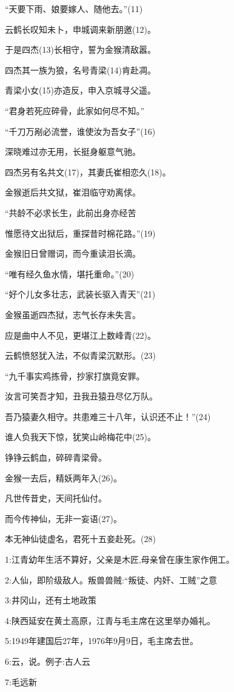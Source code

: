 \documentclass[
]{article}
\begin{document}
``天要下雨、娘要嫁人、随他去。''(11)

云鹤长叹知未卜，申城调来新朋邀(12)。

于是四杰(13)长相守，誓为金猴清敌嚣。

四杰其一族为狼，名号青梁(14)肯赴凋。

青梁小女(15)亦造反，申入京城寻父遥。

``君身若死应碎骨，此家如何尽不知。''

``千刀万剐必流誉，谁使汝为吾女子''(16)

深晓难过亦无用，长挺身躯意气驰。

四杰另有名共文(17)，其妻氏崔相恋久(18)。

金猴逝后共文狱，崔泪临守劝离俅。

``共龄不必求长生，此前出身亦经苦

惟愿待文出狱后，重探昔时棉花路。''(19)

金猴旧日曾赠词，而今重读泪长滴。

``唯有经久鱼水情，堪托重命。''(20)

``好个儿女多壮志，武装长驱入青天''(21)

金猴虽逝四杰狱，志气长存未失言。

应是曲中人不见，更堪江上数峰青(22)。

云鹤愤怒犹入法，不似青梁沉默形。(23)

``九千事实鸡拣骨，抄家打旗竟安罪。

汝言可笑吾才知，丑我丑猿丑尽亿万队。

吾乃猿妻久相守。共患难三十八年，认识还不止！''(24)

谁人负我天下惊，犹笑山岭梅花中(25)。

铮铮云鹤血，碎碎青梁骨。

金猴一去后，精妖两年入(26)。

凡世传昔史，天间托仙付。

而今传神仙，无非一妄语(27)。

本无神仙徒虚名，君死十五妾赴死。(28)

1:江青幼年生活不算好，父亲是木匠,母亲曾在康生家作佣工。

2:人仙，即阶级敌人。叛兽兽贼:``叛徒、内奸、工贼''之意

3:井冈山，还有土地政策

4:陕西延安在黄土高原，江青与毛主席在这里举办婚礼。

5:1949年建国后27年，1976年9月9日，毛主席去世。

6:云，说。例子:古人云

7:毛远新
\end{document}
